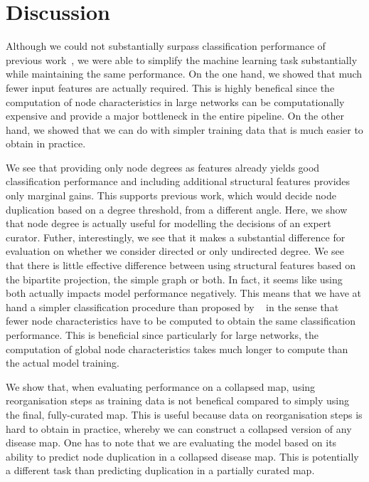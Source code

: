 \documentclass[
	fontsize=10pt, %
	twoside=true, %
	secnumdepth=1, %
  toc=indentunnumbered %
]{kaobook}
\begin{document}
\section{Discussion}
\label{sec:discussion}

Although we could not substantially surpass classification performance of
previous work~\cite{nielsen_MachineLearningSupport_2019}, we were able to
simplify the machine learning task substantially while maintaining the same
performance. On the one hand, we showed that much fewer input features are
actually required. This is highly benefical since the computation of node
characteristics in large networks can be computationally expensive and provide a
major bottleneck in the entire pipeline. On the other hand, we showed that we
can do with simpler training data that is much easier to obtain in practice.

We see that providing only node degrees as features already yields
good classification performance and including additional structural features
provides only marginal gains. This supports previous work, which would decide
node duplication based on a degree threshold, from a different angle. Here, we
show that node degree is actually useful for modelling the decisions of an
expert curator.
%
Futher, interestingly, we see that it makes a substantial difference for
evaluation on \ReconMap{} whether we consider directed or only undirected
degree.
%
We see that there is little effective difference between using structural
features based on the bipartite projection, the simple graph or both. In fact,
it seems like using both actually impacts model performance negatively. 
%
This means that we have at hand a simpler classification procedure than proposed
by \nielsen{}~\cite{nielsen_MachineLearningSupport_2019} in the sense that
fewer node characteristics have to be computed to obtain the same classification
performance. This is beneficial since particularly for large networks, the
computation of global node characteristics takes much longer to compute than
the actual model training.

We show that, when evaluating performance on a collapsed map, using
reorganisation steps as training data is not benefical compared to simply using
the final, fully-curated map. This is useful because data on reorganisation
steps is hard to obtain in practice, whereby we can construct a collapsed
version of any disease map. One has to note that we are evaluating the
model based on its ability to predict node duplication in a collapsed disease
map. This is potentially a different task than predicting duplication in a
partially curated map.
\end{document}
